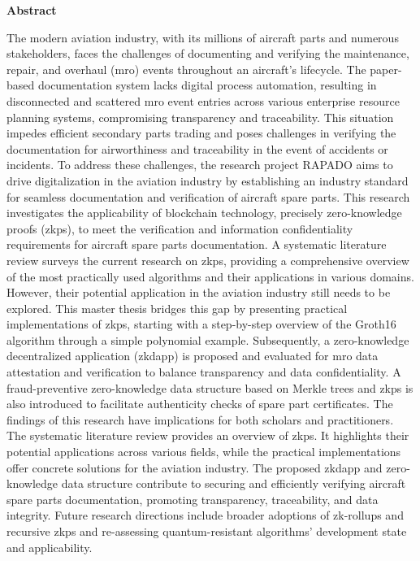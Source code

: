 \thispagestyle{empty}


\vspace*{1cm}

\begin{center}
    \textbf{Abstract}
\end{center}

\vspace*{1cm}
\noindent

The modern aviation industry, with its millions of aircraft parts and numerous stakeholders, faces the challenges of documenting and verifying the maintenance, repair, and overhaul (\acrshort{mro}) events throughout an aircraft's lifecycle. The paper-based documentation system lacks digital process automation, resulting in disconnected and scattered \acrshort{mro} event entries across various enterprise resource planning systems, compromising transparency and traceability. This situation impedes efficient secondary parts trading and poses challenges in verifying the documentation for airworthiness and traceability in the event of accidents or incidents. To address these challenges, the research project RAPADO aims to drive digitalization in the aviation industry by establishing an industry standard for seamless documentation and verification of aircraft spare parts. This research investigates the applicability of blockchain technology, precisely zero-knowledge proofs (\acrshort{zkp}s), to meet the verification and information confidentiality requirements for aircraft spare parts documentation. A systematic literature review surveys the current research on \acrshort{zkp}s, providing a comprehensive overview of the most practically used algorithms and their applications in various domains. However, their potential application in the aviation industry still needs to be explored. This master thesis bridges this gap by presenting practical implementations of \acrshort{zkp}s, starting with a step-by-step overview of the Groth16 algorithm through a simple polynomial example. Subsequently, a zero-knowledge decentralized application (\acrshort{zkdapp}) is proposed and evaluated for \acrshort{mro} data attestation and verification to balance transparency and data confidentiality. A fraud-preventive zero-knowledge data structure based on Merkle trees and \acrshort{zkp}s is also introduced to facilitate authenticity checks of spare part certificates. The findings of this research have implications for both scholars and practitioners. The systematic literature review provides an overview of \acrshort{zkp}s. It highlights their potential applications across various fields, while the practical implementations offer concrete solutions for the aviation industry. The proposed \acrshort{zkdapp} and zero-knowledge data structure contribute to securing and efficiently verifying aircraft spare parts documentation, promoting transparency, traceability, and data integrity. Future research directions include broader adoptions of zk-rollups and recursive \acrshort{zkp}s and re-assessing quantum-resistant algorithms' development state and applicability.